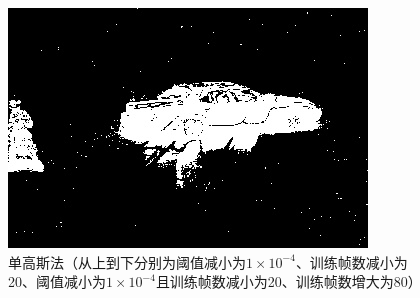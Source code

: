 \documentclass[a4paper]{ctexart}
\begin{document}
\begin{figure}[htbp]
\begin{minipage}[t]{0.2\textwidth}
	\end{minipage}
	\begin{minipage}[t]{0.2\textwidth}
		\centering
		\includegraphics[width=\textwidth]{figure/frames/single_gN80355.jpg}
	\end{minipage}
	\caption{单高斯法（从上到下分别为阈值减小为$1\times10^{-4}$、训练帧数减小为20、阈值减小为$1\times10^{-4}$且训练帧数减小为20、训练帧数增大为80）}\label{figure:单高斯法}
\end{figure}
\end{document}
